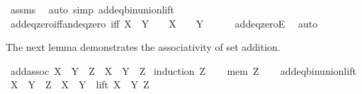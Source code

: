 \begin{isabellebody}
%
\isatagproof
{}\isamarkupfalse%
\ assms\ \isamarkupfalse%
\ {\isacharparenleft}{\kern0pt}auto\ simp{\isacharcolon}{\kern0pt}\ add{\isacharunderscore}{\kern0pt}eq{\isacharunderscore}{\kern0pt}bin{\isacharunderscore}{\kern0pt}union{\isacharunderscore}{\kern0pt}lift{\isacharparenright}{\kern0pt}%
\endisatagproof
{\isafoldproof}%
%
\isadelimproof
\isanewline
%
\endisadelimproof
\isanewline
{}\isamarkupfalse%
\ add{\isacharunderscore}{\kern0pt}eq{\isacharunderscore}{\kern0pt}zero{\isacharunderscore}{\kern0pt}iff{\isacharunderscore}{\kern0pt}and{\isacharunderscore}{\kern0pt}eq{\isacharunderscore}{\kern0pt}zero\ {\isacharbrackleft}{\kern0pt}iff{\isacharbrackright}{\kern0pt}{\isacharcolon}{\kern0pt}\ {\isachardoublequoteopen}X\ {\isacharplus}{\kern0pt}\ Y\ {\isacharequal}{\kern0pt}\ {}\ {\isasymlongleftrightarrow}\ X\ {\isacharequal}{\kern0pt}\ {}\ {\isasymand}\ Y\ {\isacharequal}{\kern0pt}\ {}{\isachardoublequoteclose}\isanewline
%
\isadelimproof
\ \ %
\endisadelimproof
%
\isatagproof
{}\isamarkupfalse%
\ add{\isacharunderscore}{\kern0pt}eq{\isacharunderscore}{\kern0pt}zeroE\ \isamarkupfalse%
\ auto%
\endisatagproof
{\isafoldproof}%
%
\isadelimproof
%
\endisadelimproof
%
\begin{isamarkuptext}%
The next lemma demonstrates the associativity of set addition.%
\end{isamarkuptext}\isamarkuptrue%
\isamarkupfalse%
\ add{\isacharunderscore}{\kern0pt}assoc{\isacharcolon}{\kern0pt}\ {\isachardoublequoteopen}{\isacharparenleft}{\kern0pt}X\ {\isacharplus}{\kern0pt}\ Y{\isacharparenright}{\kern0pt}\ {\isacharplus}{\kern0pt}\ Z\ {\isacharequal}{\kern0pt}\ X\ {\isacharplus}{\kern0pt}\ {\isacharparenleft}{\kern0pt}Y\ {\isacharplus}{\kern0pt}\ Z{\isacharparenright}{\kern0pt}{\isachardoublequoteclose}\isanewline
%
\isadelimproof
%
\endisadelimproof
%
\isatagproof
{}\isamarkupfalse%
\ {\isacharparenleft}{\kern0pt}induction\ Z{\isacharparenright}{\kern0pt}\isanewline
\ \ \isamarkupfalse%
\ {\isacharparenleft}{\kern0pt}mem\ Z{\isacharparenright}{\kern0pt}\isanewline
\ \ \isamarkupfalse%
\ add{\isacharunderscore}{\kern0pt}eq{\isacharunderscore}{\kern0pt}bin{\isacharunderscore}{\kern0pt}union{\isacharunderscore}{\kern0pt}lift\ \isamarkupfalse%
\ {\isachardoublequoteopen}{\isacharparenleft}{\kern0pt}X\ {\isacharplus}{\kern0pt}\ Y{\isacharparenright}{\kern0pt}\ {\isacharplus}{\kern0pt}\ Z\ {\isacharequal}{\kern0pt}\ {\isacharparenleft}{\kern0pt}X\ {\isacharplus}{\kern0pt}\ Y{\isacharparenright}{\kern0pt}\ {\isasymunion}\ {\isacharparenleft}{\kern0pt}lift\ {\isacharparenleft}{\kern0pt}X\ {\isacharplus}{\kern0pt}\ Y{\isacharparenright}{\kern0pt}\ Z{\isacharparenright}{\kern0pt}{\isachardoublequoteclose}\ \isamarkupfalse%

\end{isabellebody}
